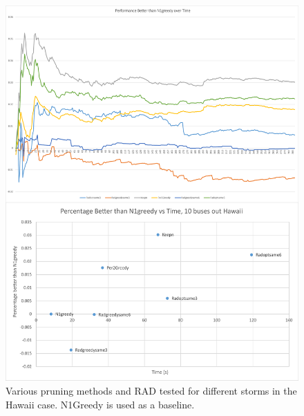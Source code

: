 \documentclass[12pt]{article}
\begin{document}
\begin{figure}[ht]
    \centering %
    \includegraphics[scale = 0.24]{Hawaii10busr2.pdf}
    \caption[Second Testing Set - 10 buses removed, Hawaii Case]{Various pruning methods and RAD tested for different storms in the Hawaii case. N1Greedy is used as a baseline.}
    \label{fig:Hawaii10busr2}
\end{figure}
\end{document}
